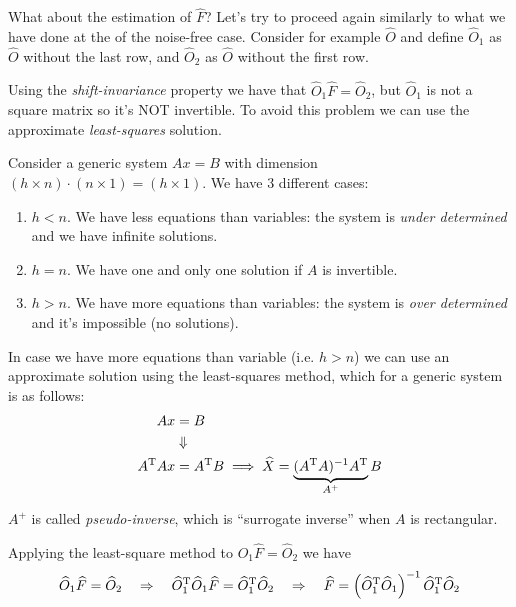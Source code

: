 What about the estimation of $\hat{F}$? Let's try to proceed again similarly to what we have done at the  of the noise-free case.
Consider for example $\hat{O}$ and define $\hat{O}_1$ as $\hat{O}$ without the last row, and $\hat{O}_2$ as $\hat{O}$ without the first row.

Using the \emph{shift-invariance} property we have that $\hat{O}_1 \hat{F} = \hat{O}_2$, but $\hat{O}_1$ is not a square matrix so it's NOT invertible.
To avoid this problem we can use the approximate \emph{least-squares} solution.


\begin{recall}
    Consider a generic system $Ax = B$ with dimension  $(h\times n) \cdot (n \times 1) = (h \times 1)$. We have 3 different cases:
    \begin{enumerate}
        \item $h < n$. We have less equations than variables: the system is \emph{under determined} and we have infinite solutions.
        \item $h = n$. We have one and only one solution if $A$ is invertible.
        \item $h > n$. We have more equations than variables: the system is \emph{over determined} and it's impossible (no solutions).
    \end{enumerate}
\end{recall}

\begin{remark}
    In case we have more equations than variable (i.e. $h>n$) we can use an approximate solution using the least-squares method, which for a generic system is as follows:
    \begin{align*}
        Ax &= B \\
           &\Downarrow\\
        A^{\mathrm{T}} A x &= A^{\mathrm{T}} B \implies \widehat{X} = \underbrace{(A^{\mathrm{T}} A)^{-1}A^{\mathrm{T}}}_{A^+} B
    \end{align*}
    
    $A^+$ is called \emph{pseudo-inverse}, which is ``surrogate inverse'' when $A$ is rectangular.
\end{remark}


Applying the least-square method to $\hat{O}_1 \hat{F} = \hat{O}_2$ we have
\begin{align*}
    \widehat{O}_1\widehat{F} = \widehat{O}_2 \quad \Rightarrow \quad
    \widehat{O}_1^{\mathrm{T}}\widehat{O}_1\widehat{F} = \widehat{O}_1^{\mathrm{T}}\widehat{O}_2 \quad \Rightarrow \quad 
    \widehat{F} = \left(\widehat{O}_1^{\mathrm{T}}\widehat{O}_1\right)^{-1} \widehat{O}_1^{\mathrm{T}}\widehat{O}_2
\end{align*}


